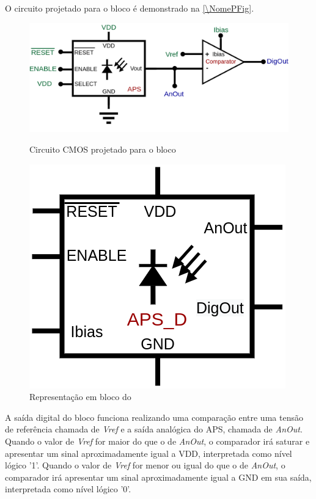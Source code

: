 O circuito projetado para o bloco \'e demonstrado na \autoref{\NomePFig}.

\begin{figure}[htb]
 \centering
    \centering
    \caption{Circuito CMOS projetado para o bloco \NomeBloco} 
    \includegraphics[scale=0.3]{Circuitos/APS_digitalized.png}
    \label{\NomePFig}
\end{figure}

\begin{figure}[htb]
 \centering
    \centering
    \caption{Representação em bloco do \NomeBloco} \label{\NomeSFig}
    \includegraphics[scale=0.3]{Circuitos/APS_digitalized_block.png}
\end{figure}

A sa\'ida digital do bloco funciona realizando uma comparação entre uma tensão de refer\^encia chamada de \textit{Vref} e a sa\'ida anal\'ogica do APS, chamada de \textit{AnOut}. Quando o valor de \textit{Vref} for maior do que o de \textit{AnOut}, o comparador ir\'a saturar e apresentar um sinal aproximadamente igual a VDD, interpretada como n\'ivel l\'ogico '1'. Quando o valor de \textit{Vref} for menor ou igual do que o de \textit{AnOut}, o comparador ir\'a apresentar um sinal aproximadamente igual a GND em sua sa\'ida, interpretada como n\'ivel l\'ogico '0'.

